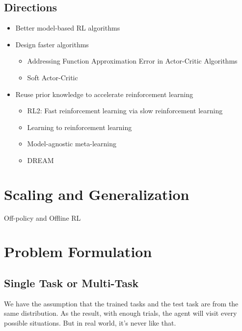 \subsection{Directions}
\begin{itemize}
	\item Better model-based \ac{RL} algorithms
	\item Design faster algorithms
	\begin{itemize}
		\item Addressing Function Approximation Error in Actor-Critic Algorithms \cite{fujimoto2018addressing}
		\item Soft Actor-Critic \cite{haarnoja2018soft}
	\end{itemize}
	\item Reuse prior knowledge to accelerate reinforcement learning
	\begin{itemize}
		\item RL2: Fast reinforcement learning via slow reinforcement learning \cite{duan2016rl}
		\item Learning to reinforcement learning \cite{wang2016learning}
		\item Model-agnostic meta-learning \cite{finn2017model}
		\item DREAM \cite{liu2020explore}
	\end{itemize}
\end{itemize}

\section{Scaling and Generalization}
Off-policy and Offline \ac{RL}

\section{Problem Formulation}
\subsection{Single Task or Multi-Task}
We have the assumption that the trained tasks and the test task are from the same distribution. As the result, with enough trials, the agent will visit every possible situations. But in real world, it's never like that.

